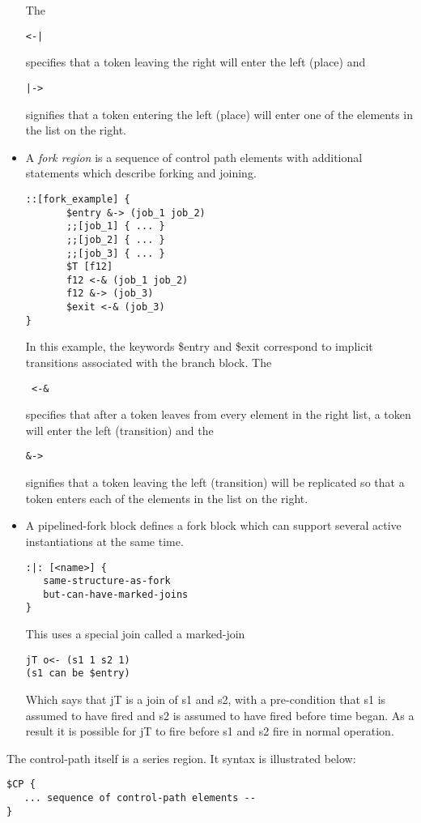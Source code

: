 \documentclass{article}
\begin{document}
\begin{itemize}
The 
\begin{verbatim}
<-|
\end{verbatim}
 specifies that a token leaving the right will enter
the left (place) and 
\begin{verbatim}
|->
\end{verbatim}
signifies that a token entering the left
(place) will enter one of the elements in the list on the right.
\item A {\em fork region} is a sequence of control path
elements with additional statements which describe 
forking and joining.
\begin{verbatim}
::[fork_example] {
       $entry &-> (job_1 job_2)
       ;;[job_1] { ... }
       ;;[job_2] { ... }
       ;;[job_3] { ... }
       $T [f12]
       f12 <-& (job_1 job_2)
       f12 &-> (job_3)
       $exit <-& (job_3)
}
\end{verbatim}

In this example, the keywords \$entry and \$exit correspond
to implicit transitions associated with the branch block.
The
\begin{verbatim}
 <-&
\end{verbatim}
 specifies that after a token leaves from every
element in the right list, a token will enter
the left (transition) and the
\begin{verbatim}
&->
\end{verbatim}
signifies that a token leaving the left
(transition) will be replicated so that a
token enters each of the elements in the list on the right.
\item A pipelined-fork block defines a fork block which can support
several active instantiations at the same time.
\begin{verbatim}
:|: [<name>] {
   same-structure-as-fork
   but-can-have-marked-joins
}
\end{verbatim}
This uses a special join called a marked-join
\begin{verbatim}
jT o<- (s1 1 s2 1)
(s1 can be $entry)
\end{verbatim}
Which says that jT is a join of s1 and s2, with a pre-condition
that s1 is assumed to have fired and s2 is assumed to have fired
before time began.  As a result it is possible for jT to fire
before s1 and s2 fire in normal operation. 
\end{itemize}

The control-path itself is a series region. It syntax is
illustrated below:
\begin{verbatim}
$CP {
   ... sequence of control-path elements --
}
\end{verbatim}
\end{document}
